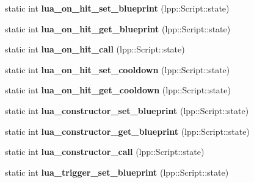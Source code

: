 \begin{DoxyCompactItemize}
\item 
static int {\bfseries lua\+\_\+on\+\_\+hit\+\_\+set\+\_\+blueprint} (lpp\+::\+Script\+::state)\hypertarget{class_lua_interface_a07af02c5a0c20be9cc89299dd5c6bebf}{}\label{class_lua_interface_a07af02c5a0c20be9cc89299dd5c6bebf}

\item 
static int {\bfseries lua\+\_\+on\+\_\+hit\+\_\+get\+\_\+blueprint} (lpp\+::\+Script\+::state)\hypertarget{class_lua_interface_a4a70c1c9bac02dcb0c0ae831987a6f25}{}\label{class_lua_interface_a4a70c1c9bac02dcb0c0ae831987a6f25}

\item 
static int {\bfseries lua\+\_\+on\+\_\+hit\+\_\+call} (lpp\+::\+Script\+::state)\hypertarget{class_lua_interface_a0c587e313063c6081eeae5dc633f4f6c}{}\label{class_lua_interface_a0c587e313063c6081eeae5dc633f4f6c}

\item 
static int {\bfseries lua\+\_\+on\+\_\+hit\+\_\+set\+\_\+cooldown} (lpp\+::\+Script\+::state)\hypertarget{class_lua_interface_a2402f3548b9a21a0627715440aa7733b}{}\label{class_lua_interface_a2402f3548b9a21a0627715440aa7733b}

\item 
static int {\bfseries lua\+\_\+on\+\_\+hit\+\_\+get\+\_\+cooldown} (lpp\+::\+Script\+::state)\hypertarget{class_lua_interface_ac2e07e5d6c98ea1d6e2cc2aaa17f2d9c}{}\label{class_lua_interface_ac2e07e5d6c98ea1d6e2cc2aaa17f2d9c}

\item 
static int {\bfseries lua\+\_\+constructor\+\_\+set\+\_\+blueprint} (lpp\+::\+Script\+::state)\hypertarget{class_lua_interface_ae7336ad73451f6edec9d9fd483b30d00}{}\label{class_lua_interface_ae7336ad73451f6edec9d9fd483b30d00}

\item 
static int {\bfseries lua\+\_\+constructor\+\_\+get\+\_\+blueprint} (lpp\+::\+Script\+::state)\hypertarget{class_lua_interface_a093093da6be205e1bab9bd6326c51735}{}\label{class_lua_interface_a093093da6be205e1bab9bd6326c51735}

\item 
static int {\bfseries lua\+\_\+constructor\+\_\+call} (lpp\+::\+Script\+::state)\hypertarget{class_lua_interface_ad0fc02e1fdeb1a4affdd4263e8b60078}{}\label{class_lua_interface_ad0fc02e1fdeb1a4affdd4263e8b60078}

\item 
static int {\bfseries lua\+\_\+trigger\+\_\+set\+\_\+blueprint} (lpp\+::\+Script\+::state)\hypertarget{class_lua_interface_a17942236b658b13cc8efd63358b389c1}{}\label{class_lua_interface_a17942236b658b13cc8efd63358b389c1}


\end{DoxyCompactItemize}
